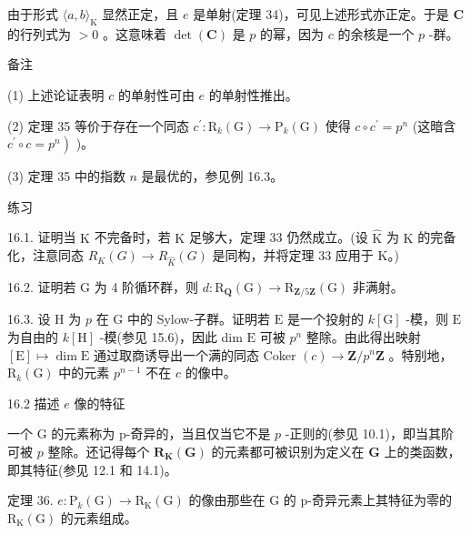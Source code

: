 \documentclass[10pt]{article}
\begin{document}
由于形式 \(\langle a,b{\rangle }_{\mathrm{K}}\) 显然正定，且 \(e\) 是单射(定理 34)，可见上述形式亦正定。于是 \(\mathbf{C}\) 的行列式为 \(> 0\) 。这意味着 \(\det \left( \mathbf{C}\right)\) 是 \(p\) 的幂，因为 \(c\) 的余核是一个 \(p\) -群。

备注

(1) 上述论证表明 \(c\) 的单射性可由 \(e\) 的单射性推出。

(2) 定理 35 等价于存在一个同态 \({c}^{\prime } : {\mathrm{R}}_{k}\left( \mathrm{G}\right)  \rightarrow  {\mathrm{P}}_{k}\left( \mathrm{G}\right)\) 使得 \(c \circ  {c}^{\prime } = {p}^{n}\) (这暗含 \(\left. {{c}^{\prime } \circ  c = {p}^{n}}\right)\) )。

(3) 定理 35 中的指数 \(n\) 是最优的，参见例 16.3。

练习

16.1. 证明当 \(\mathrm{K}\) 不完备时，若 \(\mathrm{K}\) 足够大，定理 33 仍然成立。(设 \(\widehat{\mathrm{K}}\) 为 \(\mathrm{K}\) 的完备化，注意同态 \({R}_{K}\left( G\right)  \rightarrow  {R}_{\widehat{K}}\left( G\right)\) 是同构，并将定理 33 应用于 K。)

16.2. 证明若 \(\mathrm{G}\) 为 4 阶循环群，则 \(d : {\mathrm{R}}_{\mathbf{Q}}\left( \mathrm{G}\right)  \rightarrow  {\mathrm{R}}_{\mathbf{Z}/5\mathbf{Z}}\left( \mathrm{G}\right)\) 非满射。

16.3. 设 \(\mathrm{H}\) 为 \(p\) 在 \(\mathrm{G}\) 中的 Sylow-子群。证明若 \(\mathrm{E}\) 是一个投射的 \(k\left\lbrack  \mathrm{G}\right\rbrack\) -模，则 \(\mathrm{E}\) 为自由的 \(k\left\lbrack  \mathrm{H}\right\rbrack\) -模(参见 15.6)，因此 dim \(\mathrm{E}\) 可被 \({p}^{n}\) 整除。由此得出映射 \(\left\lbrack  \mathrm{E}\right\rbrack   \mapsto  \dim \mathrm{E}\) 通过取商诱导出一个满的同态 Coker \(\left( c\right)  \rightarrow  \mathbf{Z}/{p}^{n}\mathbf{Z}\) 。特别地， \({\mathrm{R}}_{k}\left( \mathrm{G}\right)\) 中的元素 \({p}^{n - 1}\) 不在 \(c\) 的像中。

16.2 描述 \(e\) 像的特征

一个 \(\mathrm{G}\) 的元素称为 p-奇异的，当且仅当它不是 \(p\) -正则的(参见 10.1)，即当其阶可被 \(p\) 整除。还记得每个 \({\mathbf{R}}_{\mathbf{K}}\left( \mathbf{G}\right)\) 的元素都可被识别为定义在 \(\mathbf{G}\) 上的类函数，即其特征(参见 12.1 和 14.1)。

定理 36. \(e : {\mathrm{P}}_{k}\left( \mathrm{G}\right)  \rightarrow  {\mathrm{R}}_{\mathrm{K}}\left( \mathrm{G}\right)\) 的像由那些在 \(\mathrm{G}\) 的 p-奇异元素上其特征为零的 \({\mathrm{R}}_{\mathrm{K}}\left( \mathrm{G}\right)\) 的元素组成。
\end{document}
